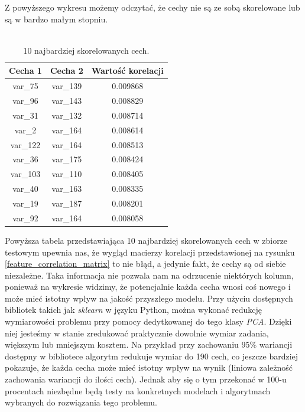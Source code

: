 \documentclass[12pt]{article}
\begin{document}
Z powyższego wykresu możemy odczytać, że cechy nie są ze sobą skorelowane lub są w bardzo małym stopniu. \\
\\
\begin{table}[H]
\centering
\begin{tabular}{|c|c|c|}
 \hline
 Cecha 1  & Cecha 2  &        Wartość korelacji \\
    \hline
     \hline
var\_75 & var\_139 &  0.009868 \\
 \hline
var\_96 & var\_143 &  0.008829 \\
 \hline
var\_31 & var\_132 &  0.008714 \\
 \hline
var\_2 & var\_164 &  0.008614 \\
 \hline
var\_122 & var\_164 &  0.008513 \\
 \hline
var\_36 & var\_175 &  0.008424 \\
 \hline
var\_103 & var\_110 &  0.008405 \\
 \hline
var\_40 & var\_163 &  0.008335 \\
 \hline
var\_19 & var\_187 &  0.008201 \\
 \hline
var\_92 & var\_164 &  0.008058 \\
 \hline
\end{tabular}
\caption{10 najbardziej skorelowanych cech.}
\end{table}
Powyższa tabela przedstawiająca 10 najbardziej skorelowanych cech w zbiorze testowym upewnia nas, że wygląd macierzy korelacji przedstawionej na rysunku \ref{feature_correlation_matrix} to nie błąd, a jedynie fakt, że cechy są od siebie niezależne.
Taka informacja nie pozwala nam na odrzucenie niektórych kolumn, ponieważ na wykresie widzimy, że potencjalnie każda cecha wnosi coś nowego i może mieć istotny wpływ na jakość przyszłego modelu.
\newline
Przy użyciu dostępnych bibliotek takich jak \textit{sklearn} w języku Python, można wykonać redukcję wymiarowości problemu przy pomocy dedytkowanej do tego klasy \textit{PCA}. Dzięki niej jesteśmy w stanie zredukować praktycznie dowolnie wymiar zadania, większym lub mniejszym kosztem.
Na przykład przy zachowaniu 95\% wariancji dostępny w bibliotece algorytm redukuje wymiar do 190 cech, co jeszcze bardziej pokazuje, że każda cecha może mieć istotny wpływ na wynik (liniowa zależność zachowania wariancji do ilości cech). Jednak aby się o tym przekonać w 100-u procentach niezbędne będą testy na konkretnych modelach i algorytmach wybranych do rozwiązania tego problemu.
\end{document}
